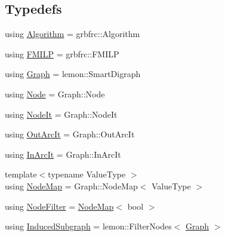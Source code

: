 \subsection*{Typedefs}
\begin{DoxyCompactItemize}
\item 
using \hyperlink{namespacederegnet_ad59156f873b7ab02d384164b900cd874}{Algorithm} = grbfrc\+::\+Algorithm
\item 
using \hyperlink{namespacederegnet_a31759ad43b8b9641205bcf69b09f10c5}{F\+M\+I\+LP} = grbfrc\+::\+F\+M\+I\+LP
\item 
using \hyperlink{namespacederegnet_a55b76c55bbabc682cbc61f8b9948799e}{Graph} = lemon\+::\+Smart\+Digraph
\item 
using \hyperlink{namespacederegnet_a744bad34f2de9856d36715a445f027f3}{Node} = Graph\+::\+Node
\item 
using \hyperlink{namespacederegnet_ac34314e1b5f456fc6d1bb9d96316de4a}{Node\+It} = Graph\+::\+Node\+It
\item 
using \hyperlink{namespacederegnet_a253cef939ea250e4cc0c967cd0117853}{Out\+Arc\+It} = Graph\+::\+Out\+Arc\+It
\item 
using \hyperlink{namespacederegnet_aed58be361aeda4ef7a9eaca2731ba830}{In\+Arc\+It} = Graph\+::\+In\+Arc\+It
\item 
{\footnotesize template$<$typename Value\+Type $>$ }\\using \hyperlink{namespacederegnet_ae102b707ae1d6f83c639ece5e0dd5658}{Node\+Map} = Graph\+::\+Node\+Map$<$ Value\+Type $>$
\item 
using \hyperlink{namespacederegnet_a50db1f8fc7c6a954d825d9e1ed9ad302}{Node\+Filter} = \hyperlink{namespacederegnet_ae102b707ae1d6f83c639ece5e0dd5658}{Node\+Map}$<$ bool $>$
\item 
using \hyperlink{namespacederegnet_ad1e0ad2af7b91e41fc1d8a15a1da5041}{Induced\+Subgraph} = lemon\+::\+Filter\+Nodes$<$ \hyperlink{namespacederegnet_a55b76c55bbabc682cbc61f8b9948799e}{Graph} $>$
\end{DoxyCompactItemize}

